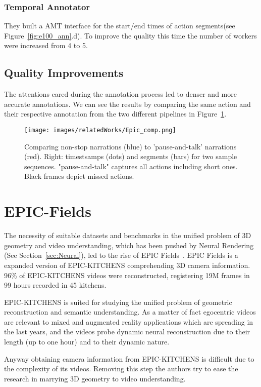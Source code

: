 \subsubsection{Temporal Annotator}
They built a AMT interface for the start/end times of action segments(see Figure~\ref{fig:e100_ann}.d).
To improve the quality this time the number of workers were increased from 4 to 5.

\subsection{Quality Improvements}
The attentions cared during the annotation process led to denser and more accurate annotations.
We can see the results by comparing the same action and their respective annotation from the
two different pipelines in Figure~\ref{fig:ep100_comp}.

\begin{figure}[t]
    \centering
    \texttt{[image: images/relatedWorks/Epic\_comp.png]} 
    \caption{Comparing non-stop narrations (blue) to 'pause-and-talk' narrations (red).
    Right: timestsamps (dots) and segments (bars) for two sample sequences. "pause-and-talk"
    captures all actions including short ones. Black frames depict missed actions.}\label{fig:ep100_comp}
\end{figure}

\section{EPIC-Fields}
The necessity of suitable datasets and benchmarks in the unified problem of 3D geometry and video understanding, which has been
pushed by Neural Rendering (See Section~\ref{sec:Neural}), led to the rise of EPIC Fields~\cite{epic_fields}. EPIC Fields is a expanded version of 
EPIC-KITCHENS comprehending 3D camera information. 96\% of EPIC-KITCHENS videos were reconstructed, registering 19M frames in 
99 hours recorded in 45 kitchens.

EPIC-KITCHENS is suited for studying the unified problem of geometric reconstruction and semantic understanding. As a matter
of fact egocentric videos  are relevant to mixed and augmented reality applications which are spreading in the last years, and 
the videos probe dynamic neural reconstruction due to their length (up to one hour) and to their dynamic nature.

Anyway obtaining camera information from EPIC-KITCHENS is difficult due to the complexity of its videos. Removing this step
the authors try to ease the research in marrying 3D geometry to video understanding.

